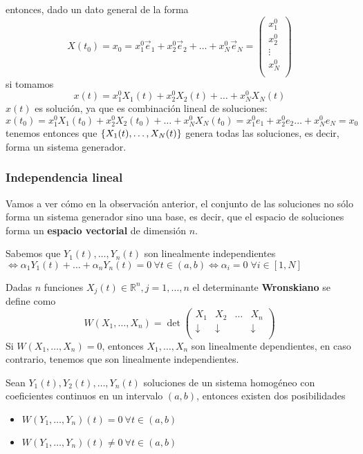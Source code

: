 \noindent entonces, dado un dato general de la forma $$X(t_0) = x_0 = x_1^0\vec{e}_1 + x_2^0\vec{e}_2+\hdots+x_N^0\vec{e}_N = \begin{pmatrix}
x_1^0\\
x_2^0\\
\vdots\\
x_N^0\\
\end{pmatrix}$$
si tomamos $$x(t) = x_1^0X_1(t)+x_2^0X_2(t)+\hdots +x_N^0X_N(t)$$ $x(t)$ es solución, ya que es combinación lineal de soluciones:
$$x(t_0) = x_1^0X_1(t_0)+x_2^0X_2(t_0)+\hdots+x_N^0X_N(t_0) = x_1^0e_1+x_2^0e_2\hdots+x_N^0e_N = x_0$$
tenemos entonces que $\{ X_1(t),\hdots,X_N(t) \}$ genera todas las soluciones, es decir, forma un sistema generador.

\subsubsection{Independencia lineal}
Vamos a ver cómo en la observación anterior, el conjunto de las soluciones no sólo forma un sistema generador sino una base, es decir, que el espacio de soluciones forma un \textbf{espacio vectorial} de dimensión $n$.

Sabemos que
$Y_1(t), \dotsc, Y_n(t) $ son linealmente independientes $ \iff \alpha_1 Y_1(t)+\hdots+\alpha_n Y_n(t) = 0\ \forall t \in (a, b) \iff \alpha_i = 0\; ∀ i ∈ [1,N]$

\begin{definition}
Dadas $n$ funciones $X_j(t) \in ℝ^n, j=1,\dotsc,n$ el determinante \textbf{Wronskiano} se define como
$$W(X_1, \hdots, X_n) = \det
\begin{pmatrix}
X_1 & X_2 & \hdots & X_n\\
\downarrow & \downarrow & & \downarrow \\
\end{pmatrix}$$
Si $W(X_1, \hdots, X_n) = 0$, entonces $X_1, \hdots, X_n$ son linealmente dependientes, en caso contrario, tenemos que son linealmente independientes.
\end{definition}

\begin{theorem}
Sean $Y_1(t), Y_2(t), \hdots, Y_n(t)$ soluciones de un sistema homogéneo con coeficientes continuos en un intervalo $(a,b)$, entonces existen dos posibilidades
\begin{itemize}
\item $W(Y_1, \hdots, Y_n)(t) = 0\ \forall t \in (a, b)$
\item $W(Y_1, \hdots, Y_n)(t) \neq 0\ \forall t \in (a, b)$
\end{itemize}
\end{theorem}

